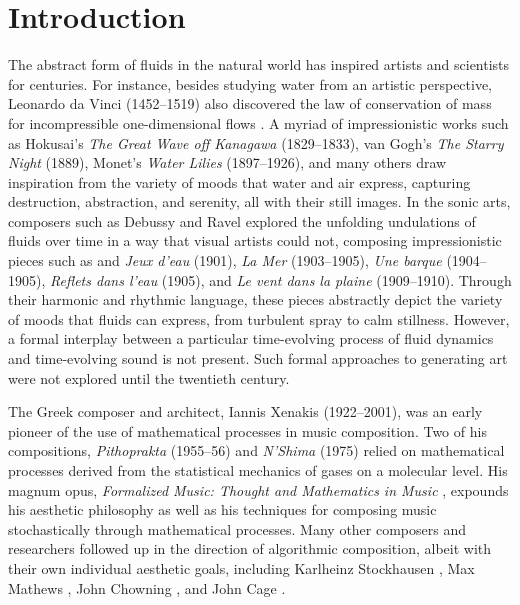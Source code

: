 \chapter{Introduction}
\label{chap:Intro}

The abstract form of fluids in the natural world has inspired artists and scientists for centuries. 
For instance, besides studying water from an artistic perspective, Leonardo da Vinci (1452--1519) also discovered the law of conservation of mass for incompressible one-dimensional flows \cite{gad1998fluid}. A myriad of impressionistic works such as Hokusai's {\em The Great Wave off Kanagawa} (1829--1833), van Gogh's {\em The Starry Night} (1889), Monet's {\em Water Lilies} (1897--1926), and many others draw inspiration from the variety of moods that water and air express, capturing destruction, abstraction, and serenity, all with their still images. In the sonic arts, composers such as Debussy and Ravel explored the unfolding undulations of fluids over time in a way that visual artists could not, composing impressionistic pieces such as and {\em Jeux d'eau} (1901), {\em La Mer}  (1903--1905), {\em Une barque} (1904--1905), {\em Reflets dans l'eau} (1905), and {\em Le vent dans la plaine} (1909--1910). Through their harmonic and rhythmic language, these pieces abstractly depict the variety of moods that fluids can express, from turbulent spray to calm stillness. However, a formal interplay between a particular time-evolving process of fluid dynamics and time-evolving sound is not present. Such formal approaches to generating art were not explored until the twentieth century.

The Greek composer and architect, Iannis Xenakis (1922--2001), was an early pioneer of the use of mathematical processes in music composition. Two of his compositions, {\em Pithoprakta} (1955--56) and {\em N'Shima} (1975) relied on mathematical processes derived from the statistical mechanics of gases on a molecular level. His magnum opus, {\em Formalized Music: Thought and Mathematics in Music} \cite{xenakis1992formalized}, expounds his aesthetic philosophy as well as his techniques for composing music stochastically through mathematical processes. Many other composers and researchers followed up in the direction of algorithmic
composition, albeit with their own individual aesthetic goals, including Karlheinz Stockhausen \cite{stockhausen1962concept}, Max Mathews \cite{mathews1963digital}, John Chowning \cite{chowning1973synthesis}, and John Cage \cite{cage2011silence}.

